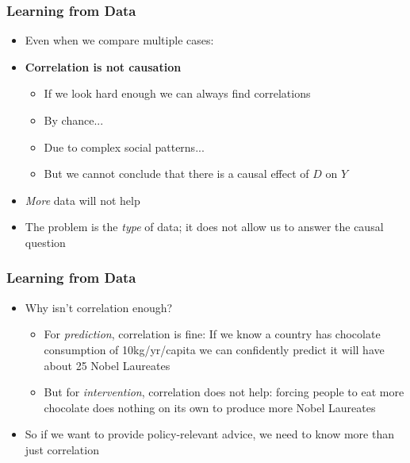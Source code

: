 \documentclass[xcolor=x11names,compress]{beamer}\usepackage[]{graphicx}\usepackage[]{color}
\renewcommand{\(}{\begin{columns}}
\renewcommand{\)}{\end{columns}}
\newcommand{\<}[1]{\begin{column}{#1}}
\renewcommand{\>}{\end{column}}
\begin{document}
\begin{frame}
\frametitle{Learning from Data}
\begin{itemize}
\item Even when we compare multiple cases: 
\pause
\item \textbf{Correlation is not causation}
\pause
\begin{itemize}
\item If we look hard enough we can always find correlations
\pause
\item By chance...
\pause
\item Due to complex social patterns...
\pause
\item But we cannot conclude that there is a causal effect of $D$ on $Y$
\pause
\end{itemize}
\item \textit{More} data will not help
\pause
\item The problem is the \textit{type} of data; it does not allow us to answer the causal question 
\end{itemize}
\end{frame}














\begin{frame}
\frametitle{Learning from Data}
\begin{itemize}
\item Why isn't correlation enough?
\pause
\begin{itemize}
\item For \textit{prediction}, correlation is fine: If we know a country has chocolate consumption of 10kg/yr/capita we can confidently predict it will have about 25 Nobel Laureates
\pause
\item But for \textit{intervention}, correlation does not help: forcing people to eat more chocolate does nothing on its own to produce more Nobel Laureates
\pause
\end{itemize}
\item So if we want to provide policy-relevant advice, we need to know more than just correlation
\end{itemize}
\end{frame}
\end{document}
